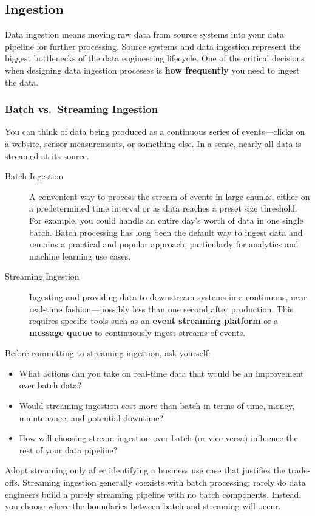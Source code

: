 \documentclass{article}
\begin{document}
\subsection{Ingestion}
Data ingestion means moving raw data from source systems into your data pipeline for further processing. Source systems and data ingestion represent the biggest bottlenecks of the data engineering lifecycle. One of the critical decisions when designing data ingestion processes is \textbf{how frequently} you need to ingest the data.

\subsubsection{Batch vs.\ Streaming Ingestion}
You can think of data being produced as a continuous series of events---clicks on a website, sensor measurements, or something else. In a sense, nearly all data is streamed at its source.

\begin{description}
    \item[Batch Ingestion] A convenient way to process the stream of events in large chunks, either on a predetermined time interval or as data reaches a preset size threshold. For example, you could handle an entire day's worth of data in one single batch. Batch processing has long been the default way to ingest data and remains a practical and popular approach, particularly for analytics and machine learning use cases.

    \item[Streaming Ingestion] Ingesting and providing data to downstream systems in a continuous, near real-time fashion---possibly less than one second after production. This requires specific tools such as an \textbf{event streaming platform} or a \textbf{message queue} to continuously ingest streams of events.
\end{description}

Before committing to streaming ingestion, ask yourself:
\begin{itemize}
    \item What actions can you take on real-time data that would be an improvement over batch data?
    \item Would streaming ingestion cost more than batch in terms of time, money, maintenance, and potential downtime?
    \item How will choosing stream ingestion over batch (or vice versa) influence the rest of your data pipeline?
\end{itemize}
Adopt streaming only after identifying a business use case that justifies the trade-offs. Streaming ingestion generally coexists with batch processing; rarely do data engineers build a purely streaming pipeline with no batch components. Instead, you choose where the boundaries between batch and streaming will occur.
\end{document}

